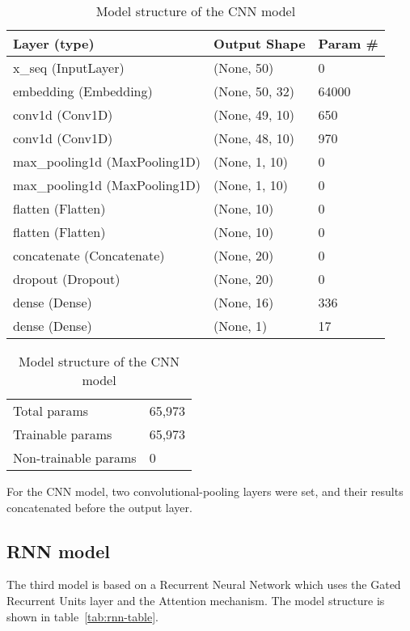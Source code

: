 \documentclass[runningheads]{llncs}
\begin{document}
\begin{table}
\centering
\begin{tabular}{|l|l|l|}
\hline
\rowcolor[HTML]{C0C0C0} 
\textbf{Layer (type)} & \textbf{Output Shape} & \textbf{Param \#} \\ \hline
x\_seq (InputLayer) & (None, 50) & 0 \\ \hline
embedding (Embedding) & (None, 50, 32) & 64000 \\ \hline
conv1d (Conv1D) & (None, 49, 10) & 650 \\ \hline
conv1d (Conv1D) & (None, 48, 10) & 970 \\ \hline
max\_pooling1d (MaxPooling1D) & (None, 1, 10) & 0 \\ \hline
max\_pooling1d (MaxPooling1D) & (None, 1, 10) & 0 \\ \hline
flatten (Flatten) & (None, 10) & 0 \\ \hline
flatten (Flatten) & (None, 10) & 0 \\ \hline
concatenate (Concatenate) & (None, 20) & 0 \\ \hline
dropout (Dropout) & (None, 20) & 0 \\ \hline
dense (Dense) & (None, 16) & 336 \\ \hline
dense (Dense) & (None, 1) & 17 \\ \hline
\end{tabular}
\caption{Model structure of the CNN model}
\label{tab:cnn-table}

\begin{tabular}{ll}
Total params & 65,973 \\
Trainable params & 65,973 \\
Non-trainable params & 0
\end{tabular}
\end{table}

For the CNN model, two convolutional-pooling layers were set, and their results concatenated before the output layer.

\subsection{RNN model}
The third model is based on a Recurrent Neural Network which uses the Gated Recurrent Units layer and the Attention mechanism. The model structure is shown in table~\ref{tab:rnn-table}.
\end{document}
